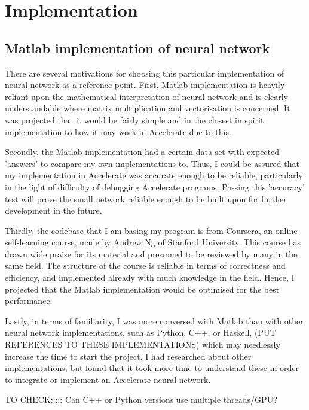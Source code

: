 
\chapter{Implementation}\label{ch:impl}

\section{Matlab implementation of neural network} \label{se:impl.matlab.nn}

There are several motivations for choosing this particular implementation of neural network as a reference point. First, Matlab implementation is heavily reliant upon the mathematical interpretation of neural network and is clearly understandable where matrix multiplication and vectorisation is concerned. It was projected that it would be fairly simple and in the closest in spirit implementation to how it may work in Accelerate due to this.

Secondly, the Matlab implementation had a certain data set with expected 'answers' to compare my own implementations to. Thus, I could be assured that my implementation in Accelerate was accurate enough to be reliable, particularly in the light of difficulty of debugging Accelerate programs. Passing this 'accuracy' test will prove the small network reliable enough to be built upon for further development in the future.

Thirdly, the codebase that I am basing my program is from Coursera, an online self-learning course, made by Andrew Ng of Stanford University. This course has drawn wide praise for its material and presumed to be reviewed by many in the same field. The structure of the course is reliable in terms of correctness and efficiency, and implemented already with much knowledge in the field. Hence, I projected that the Matlab implementation would be optimised for the best performance.

Lastly, in terms of familiarity, I was more conversed with Matlab than with other neural network implementations, such as Python, C++, or Haskell, (PUT REFERENCES TO THESE IMPLEMENTATIONS) which may needlessly increase the time to start the project. I had researched about other implementations, but found that it took more time to understand these in order to integrate or implement an Accelerate neural network.

TO CHECK::::: Can C++ or Python versions use multiple threads/GPU?

